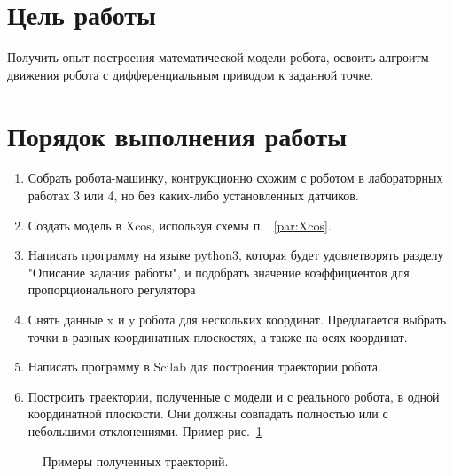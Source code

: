 \documentclass[12pt,a4paper,openany]{extarticle}
\begin{document}
\section{Цель работы}
Получить опыт построения математической модели робота, освоить алгроитм движения робота с дифференциальным приводом к заданной точке.
\section{Порядок выполнения работы}
\begin{enumerate}
\item Собрать робота-машинку, контрукционно схожим с роботом в лабораторных работах 3 или 4, но без каких-либо установленных датчиков.
\item Создать модель в Xcos, используя схемы п. ~\ref{par:Xcos}. 
\item Написать программу на языке python3, которая будет удовлетворять разделу "Описание задания работы", и подобрать значение коэффициентов для пропорционального регулятора
\item Снять данные x и y робота для нескольких координат. Предлагается выбрать точки в разных координатных плоскостях, а также на осях координат. 
\item Написать программу в Scilab для построения траектории робота.
\item Построить траектории, полученные с модели и с реального робота, в одной координатной плоскости. Они должны совпадать полностью или с небольшими отклонениями. Пример рис.~\ref{fig:trajes}
\end{enumerate}
\begin{figure}[h!]
    \caption{Примеры полученных траекторий.}
	\label{fig:trajes}
\end{figure} 
\end{document}
